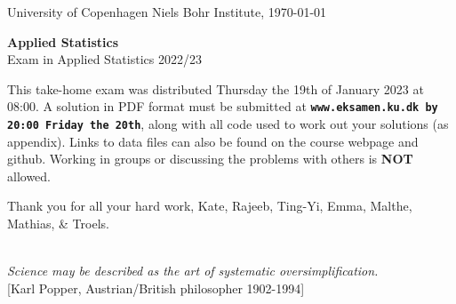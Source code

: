 \documentclass[11pt]{article}
\begin{document}

\noindent
University of Copenhagen \hfill
Niels Bohr Institute, \today \par
\vspace{-2ex}
\noindent
\hrulefill

\vspace{1ex}
\begin{center}
{\bf {\Huge Applied Statistics}}\\
\vspace{1ex}
{\large Exam in Applied Statistics 2022/23}
\end{center}

\vspace{0ex}
\noindent
This take-home exam was distributed Thursday the 19th of January 2023 at 08:00. A solution in PDF format must be submitted at \texttt{\bf www.eksamen.ku.dk by 20:00 Friday the 20th}, along with all code used to work out your solutions (as appendix). Links to data files can also be found on the course webpage and github. Working in groups or discussing the problems with others is {\bf NOT} allowed.

\vspace{-1ex}
\begin{center}
  Thank you for all your hard work, Kate, Rajeeb, Ting-Yi, Emma, Malthe, Mathias, \& Troels.
\end{center}


\noindent
\hrulefill\\
\emph{Science may be described as the art of systematic oversimplification.}\\
  \phantom{foobar} \hfill [Karl Popper, Austrian/British philosopher 1902-1994]\\[-2ex]

  
\vspace{-2ex}
\noindent
\hrulefill
\end{document}
